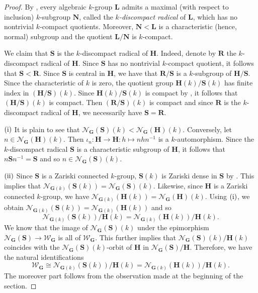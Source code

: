 \documentclass[11pt]{amsart}
\numberwithin{equation}{section}
\theoremstyle{plain}
\theoremstyle{definition}
\begin{document}
\begin{proof} By \cite[Proposition 1.4]{Sh97}, every algebraic $k$-group $\mathbf L$ admits a maximal (with respect to inclusion) $k$-subgroup $\mathbf N$, called the {\it $k$-discompact radical} of $\mathbf L$, which has no nontrivial $k$-compact quotients. Moreover, $\mathbf N<\mathbf L$ is a characteristic (hence, normal) subgroup and the quotient $\mathbf L/\mathbf N$ is $k$-compact.



We claim that $\mathbf S$ is the $k$-discompact radical of $\mathbf H$. Indeed, denote by $\mathbf R$ the $k$-discompact radical of $\mathbf H$. Since $\mathbf S$ has no nontrivial $k$-compact quotient, it follows that $\mathbf S < \mathbf R$. Since $\mathbf S$ is central in $\mathbf H$, we have that $\mathbf R/\mathbf S$ is a $k$-subgroup of $\mathbf H/\mathbf S$. Since the characteristic of $k$ is zero, the quotient group $\mathbf H(k)/\mathbf S(k)$ has finite index in $(\mathbf H/\mathbf S)(k)$. Since $\mathbf H(k)/\mathbf S(k)$ is compact by \cite[Proposition I.2.3.6]{Ma91}, it follows that $(\mathbf H/\mathbf S)(k)$ is compact. Then $(\mathbf R/\mathbf S)(k)$ is compact and since $\mathbf R$ is the $k$-discompact radical of $\mathbf H$, we necessarily have $\mathbf S = \mathbf R$.


$(\rm i)$ It is plain to see that $\mathscr N_{\mathbf G}(\mathbf S)(k) < \mathscr N_{\mathbf G}(\mathbf H)(k)$. Conversely, let $n \in \mathscr N_{\mathbf G}(\mathbf H)(k)$. Then $\iota_n : \mathbf H \to \mathbf H : h \mapsto n h n^{-1}$ is a $k$-automorphism. Since the $k$-discompact radical $\mathbf S$ is a characteristic subgroup of $\mathbf H$, it follows that $n \mathbf S n^{-1} = \mathbf S$ and so $n \in \mathscr N_{\mathbf G}(\mathbf S)(k)$.

$(\rm ii)$ Since $\mathbf S$ is a Zariski connected $k$-group, $\mathbf S(k)$ is Zariski dense in $\mathbf S$ by \cite[Proposition I.2.5.3(ii)]{Ma91}. This implies that $\mathscr N_{\mathbf G(k)}(\mathbf S(k)) =  \mathscr N_{\mathbf G}(\mathbf S)(k)$. Likewise, since $\mathbf H$ is a Zariski connected $k$-group, we have $\mathscr N_{\mathbf G(k)}(\mathbf H(k)) =  \mathscr N_{\mathbf G}(\mathbf H)(k)$. Using $(\rm i)$, we obtain $\mathscr N_{\mathbf G(k)}(\mathbf S(k)) = \mathscr N_{\mathbf G(k)}(\mathbf H(k))$ and so 
$$\mathscr N_{\mathbf G(k)}(\mathbf S(k))/\mathbf H(k) = \mathscr N_{\mathbf G(k)}(\mathbf H(k))/\mathbf H(k).$$
We know that the image of $\mathscr N_{\mathbf G}(\mathbf S)(k)$ under the epimorphism $\mathscr N_{\mathbf G}(\mathbf S) \to \mathscr W_{\mathbf G}$ is all of $\mathscr W_{\mathbf G}$. This further implies that $\mathscr N_{\mathbf G}(\mathbf S)(k)/\mathbf H(k)$ coincides with the $\mathscr N_{\mathbf G}(\mathbf S)(k)$-orbit of $\mathbf H$ in $\mathscr N_{\mathbf G}(\mathbf S)/\mathbf H$. Therefore, we have the natural identifications 
$$\mathscr W_{\mathbf G} \cong \mathscr N_{\mathbf G(k)}(\mathbf S(k))/\mathbf H(k) = \mathscr N_{\mathbf G(k)}(\mathbf H(k))/\mathbf H(k).$$
The moreover part follows from the observation made at the beginning of the section.


\end{proof}
\end{document}
